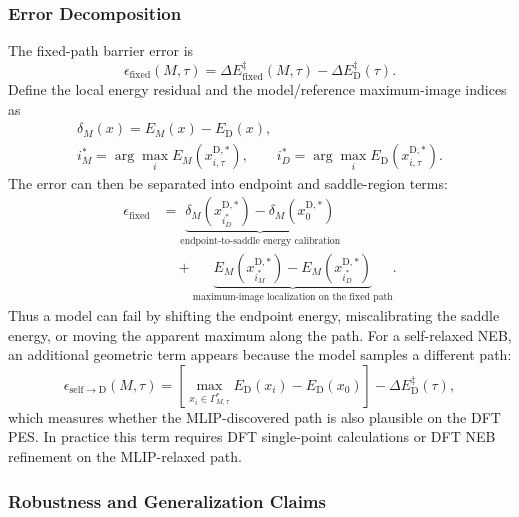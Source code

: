 \subsubsection{Error Decomposition}
\label{sec:error_decomposition_formal}

The fixed-path barrier error is
\[
    \epsilon_{\mathrm{fixed}}(M,\tau)
    =
    \Delta E_{\mathrm{fixed}}^{\ddagger}(M,\tau)
    -
    \Delta E_{\mathrm D}^{\ddagger}(\tau).
\]
Define the local energy residual and the model/reference maximum-image indices as
\[
\begin{gathered}
    \delta_M(x)=E_M(x)-E_{\mathrm D}(x),\\
    i_M^{*}=\arg\max_i E_M(x_{i,\tau}^{\mathrm D,*}),\qquad
    i_D^{*}=\arg\max_i E_{\mathrm D}(x_{i,\tau}^{\mathrm D,*}).
\end{gathered}
\]
The error can then be separated into endpoint and saddle-region terms:
\[
\begin{aligned}
    \epsilon_{\mathrm{fixed}}
    &=
    \underbrace{
    \delta_M(x_{i_D^{*}}^{\mathrm D,*})
    -
    \delta_M(x_{0}^{\mathrm D,*})
    }_{\text{endpoint-to-saddle energy calibration}}
    \\[2pt]
    &\quad+
    \underbrace{
    E_M(x_{i_M^{*}}^{\mathrm D,*})
    -
    E_M(x_{i_D^{*}}^{\mathrm D,*})
    }_{\text{maximum-image localization on the fixed path}}.
\end{aligned}
\]
Thus a model can fail by shifting the endpoint energy, miscalibrating the saddle energy, or moving the apparent maximum along the path. For a self-relaxed NEB, an additional geometric term appears because the model samples a different path:
\[
    \epsilon_{\mathrm{self}\rightarrow\mathrm D}(M,\tau)
    =
    \left[
    \max_{x_i\in\Gamma_{M,\tau}^{*}}E_{\mathrm D}(x_i)-E_{\mathrm D}(x_0)
    \right]
    -
    \Delta E_{\mathrm D}^{\ddagger}(\tau),
\]
which measures whether the MLIP-discovered path is also plausible on the DFT PES. In practice this term requires DFT single-point calculations or DFT NEB refinement on the MLIP-relaxed path.

\subsubsection{Robustness and Generalization Claims}
\label{sec:claims_formal}

